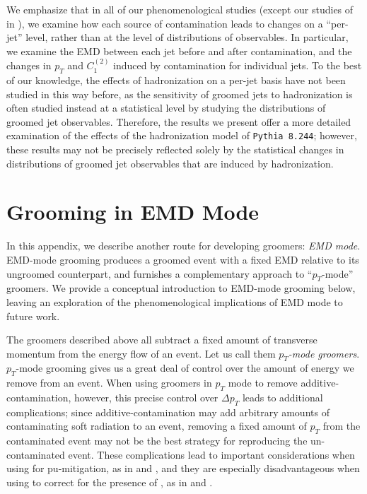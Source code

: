 \begin{subappendices}
We emphasize that in all of our phenomenological studies (except our studies of  in ), we examine how each source of contamination leads to changes on a ``per-jet'' level, rather than at the level of distributions of observables.
%
In particular, we examine the EMD between each jet before and after contamination, and the changes in \(p_T\) and \(C_1^{(2)}\) induced by contamination for individual jets.
%
To the best of our knowledge, the effects of \gls{hadronization} on a per-jet basis have not been studied in this way before, as the sensitivity of groomed jets to \gls{hadronization} is often studied instead at a statistical level by studying the distributions of groomed jet observables.
%
Therefore, the results we present offer a more detailed examination of the effects of the \gls{hadronization} model of \texttt{Pythia 8.244};
%
however, these results may not be precisely reflected solely by the statistical changes in distributions of groomed jet observables that are induced by \gls{hadronization}.



\section{Grooming in EMD Mode}
\label{app:grooming_in_emd_mode}
In this appendix, we describe another route for developing \PIRANHA{} groomers:
%
\textit{EMD mode}.
%
EMD-mode grooming produces a groomed event with a fixed EMD relative to its ungroomed counterpart, and furnishes a complementary approach to ``\(p_T\)-mode'' groomers.
%
We provide a conceptual introduction to EMD-mode grooming below, leaving an exploration of the phenomenological implications of EMD mode to future work.


The \PIRANHA{} groomers described above all subtract a fixed amount of transverse momentum from the energy flow of an event.
%
Let us call them \textit{\(p_T\)-mode groomers}.
%
\(p_T\)-mode grooming gives us a great deal of control over the amount of energy we remove from an event.
%
When using \PIRANHA{} groomers in \(p_T\) mode to remove \gls{additive-contamination}, however, this precise control over \(\Delta p_T\) leads to additional complications;
%
since \gls{additive-contamination} may add arbitrary amounts of contaminating soft radiation to an event, removing a fixed amount of \(p_T\) from the contaminated event may not be the best strategy for reproducing the un-contaminated event.
%
These complications lead to important considerations when using \PIRANHA{} for \gls{pu-mitigation}, as in  and , and they are especially disadvantageous when using \PIRANHA{} to correct for the presence of , as in  and .


\end{subappendices}
